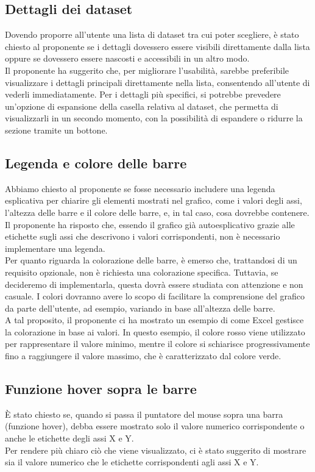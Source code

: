\subsection{Dettagli dei dataset}
Dovendo proporre all'utente una lista di dataset tra cui poter scegliere, è stato chiesto al proponente se i dettagli dovessero essere visibili direttamente dalla lista oppure se dovessero essere nascosti e accessibili in un altro modo.\\
Il proponente ha suggerito che, per migliorare l'usabilità, sarebbe preferibile visualizzare i dettagli principali direttamente nella lista, consentendo all'utente di vederli immediatamente. Per i dettagli più specifici, si potrebbe prevedere un'opzione di espansione della casella relativa al dataset, che permetta di visualizzarli in un secondo momento, con la possibilità di espandere o ridurre la sezione tramite un bottone.
\subsection{Legenda e colore delle barre}  
Abbiamo chiesto al proponente se fosse necessario includere una legenda esplicativa per chiarire gli elementi mostrati nel grafico, come i valori degli assi, l'altezza delle barre e il colore delle barre, e, in tal caso, cosa dovrebbe contenere.\\
Il proponente ha risposto che, essendo il grafico già autoesplicativo grazie alle etichette sugli assi che descrivono i valori corrispondenti, non è necessario implementare una legenda.  
\\Per quanto riguarda la colorazione delle barre, è emerso che, trattandosi di un requisito opzionale, non è richiesta una colorazione specifica. Tuttavia, se decideremo di implementarla, questa dovrà essere studiata con attenzione e non casuale. I colori dovranno avere lo scopo di facilitare la comprensione del grafico da parte dell'utente, ad esempio, variando in base all'altezza delle barre.\\
A tal proposito, il proponente ci ha mostrato un esempio di come Excel gestisce la colorazione in base ai valori. In questo esempio, il colore rosso viene utilizzato per rappresentare il valore minimo, mentre il colore si schiarisce progressivamente fino a raggiungere il valore massimo, che è caratterizzato dal colore verde.
\subsection{Funzione hover sopra le barre}
È stato chiesto se, quando si passa il puntatore del mouse sopra una barra (funzione hover), debba essere mostrato solo il valore numerico corrispondente o anche le etichette degli assi X e Y.\\
Per rendere più chiaro ciò che viene visualizzato, ci è stato suggerito di mostrare sia il valore numerico che le etichette corrispondenti agli assi X e Y.
